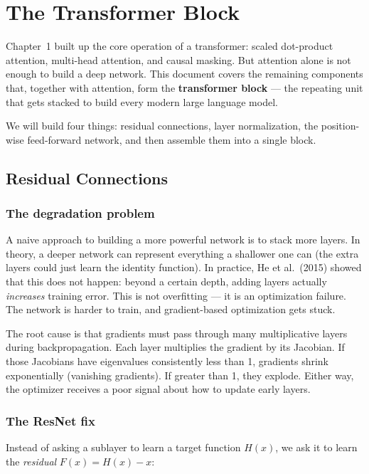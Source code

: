 \chapter{The Transformer Block}

Chapter~1 built up the core operation of a transformer: scaled dot-product attention, multi-head attention, and causal masking. But attention alone is not enough to build a deep network. This document covers the remaining components that, together with attention, form the \textbf{transformer block} --- the repeating unit that gets stacked to build every modern large language model.

We will build four things: residual connections, layer normalization, the position-wise feed-forward network, and then assemble them into a single block.

\section{Residual Connections}

\subsection{The degradation problem}

A naive approach to building a more powerful network is to stack more layers. In theory, a deeper network can represent everything a shallower one can (the extra layers could just learn the identity function). In practice, He et al.\ (2015) showed that this does not happen: beyond a certain depth, adding layers actually \textit{increases} training error. This is not overfitting --- it is an optimization failure. The network is harder to train, and gradient-based optimization gets stuck.

The root cause is that gradients must pass through many multiplicative layers during backpropagation. Each layer multiplies the gradient by its Jacobian. If those Jacobians have eigenvalues consistently less than 1, gradients shrink exponentially (vanishing gradients). If greater than 1, they explode. Either way, the optimizer receives a poor signal about how to update early layers.

\subsection{The ResNet fix}

Instead of asking a sublayer to learn a target function $H(x)$, we ask it to learn the \textit{residual} $F(x) = H(x) - x$:

